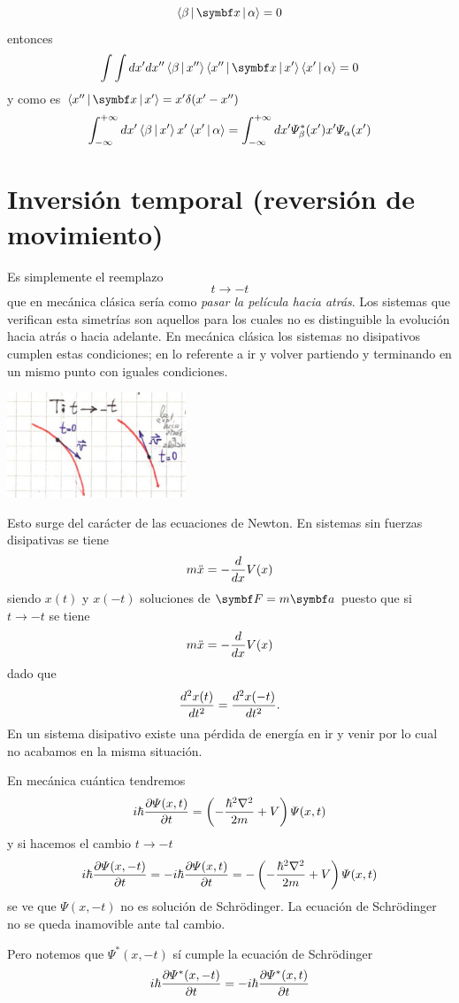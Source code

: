 \documentclass[10pt,oneside]{CBFT_book}
\begin{document}
\[
	\Braket{\beta|\vb{x}|\alpha} = 0 
\]
entonces
\[
	\int\int dx'dx''\Braket{\beta|x''}\Braket{x''|\vb{x}|x'}\Braket{x'|\alpha}= 0
\]
y como es $\Braket{x''|\vb{x}|x'} = x' \delta(x' -x'')$
\[
	\int_{-\infty}^{+\infty} dx'\Braket{\beta|x'} x' \Braket{x'|\alpha} =
	\int_{-\infty}^{+\infty} dx'\Psi_\beta^*(x') x' \Psi_\alpha (x')
\]

\section{Inversión temporal (reversión de movimiento)}


Es simplemente el reemplazo
\[
	t \longrightarrow -t
\]
que en mecánica clásica sería como {\it pasar la película hacia atrás}. Los sistemas que verifican
esta simetrías son aquellos para los cuales no es distinguible la evolución hacia atrás o hacia adelante.
En mecánica clásica los sistemas no disipativos cumplen estas condiciones; en lo referente a ir y volver
partiendo y terminando en un mismo punto con iguales condiciones.

\includegraphics[width=0.4\textwidth]{images/fig_ft2_temporal_1.jpg}

Esto surge del carácter de las ecuaciones de Newton. 
En sistemas sin fuerzas disipativas se tiene 
\[
	m \ddot{x} = - \dtot{}{x} V(x)
\]
siendo $x(t)$ y $x(-t)$ soluciones de $\vb{F} = m\vb{a}$ puesto que si $t\to-t$ se tiene
\[
	m \ddot{x} = - \dtot{}{x} V(x)
\]
dado que 
\[
	\dtot[2]{x(t)}{t} = \dtot[2]{x(-t)}{t}.
\]
En un sistema disipativo existe una pérdida de energía en ir y venir por lo cual no acabamos en la
misma situación.

En mecánica cuántica tendremos 
\[
	i \hbar \dpar{\Psi(x,t)}{t} = \left( -\frac{\hbar^2\nabla^2}{2m} + V \right)\Psi(x,t)
\]
y si hacemos el cambio $t\to -t$
\[
	i \hbar \dpar{\Psi(x,-t)}{t} = -i \hbar \dpar{\Psi(x,t)}{t}  = 
	- \left( -\frac{\hbar^2\nabla^2}{2m} + V \right)\Psi(x,t)
\]
se ve que $\Psi(x,-t)$ no es solución de Schrödinger. La ecuación de Schrödinger no se queda
inamovible ante tal cambio.

Pero notemos que $\Psi^*(x,-t)$ sí cumple la ecuación de Schrödinger
\[
	i \hbar \dpar{\Psi^*(x,-t)}{t} = -i \hbar \dpar{\Psi^*(x,t)}{t} 
\]
\end{document}
